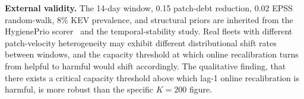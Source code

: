 \textbf{External validity.} The 14-day window, 0.15 patch-debt
reduction, 0.02 EPSS random-walk, 8\% KEV prevalence, and structural
priors are inherited from the HygienePrio scorer~\cite{paper4hygieneprio} and
the temporal-stability study. Real fleets with different patch-velocity
heterogeneity may exhibit different distributional shift rates between
windows, and the capacity threshold at which online recalibration
turns from helpful to harmful would shift accordingly. The qualitative
finding, that there exists a critical capacity threshold above
which lag-1 online recalibration is harmful, is more robust than
the specific $K = 200$ figure.
